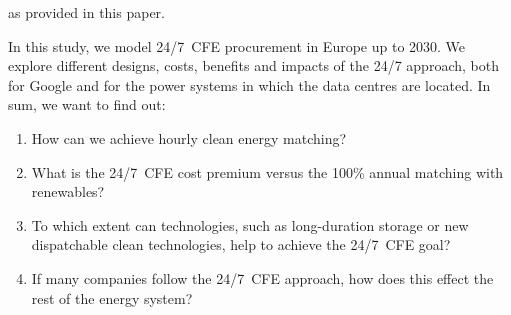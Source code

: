 
as provided in this paper.

In this study, we model 24/7~CFE procurement in Europe up to 2030. 
We explore different designs, costs, benefits and impacts of the 24/7 approach, both for Google and for the power systems in which the data centres are located. 
In sum, we want to find out: 

\begin{enumerate}
    \item How can we achieve hourly clean energy matching? 
    \item What is the 24/7~CFE cost premium versus the 100\% annual matching with renewables? 
    \item To which extent can technologies, such as long-duration storage or new dispatchable clean technologies, help to achieve the 24/7~CFE goal? 
    \item If many companies follow the 24/7~CFE approach, how does this effect the rest of the energy system?
\end{enumerate}



